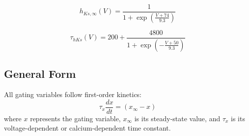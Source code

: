 \documentclass{article}
\begin{document}
\begin{equation}
h_{Ks,\infty}(V) = \frac{1}{1 + \exp\left(\frac{V + 74}{9.3}\right)}
\end{equation}

\begin{equation}
\tau_{hKs}(V) = 200 + \frac{4800}{1 + \exp\left(-\frac{V + 50}{9.3}\right)}
\end{equation}

\subsection*{General Form}
All gating variables follow first-order kinetics:
\begin{equation}
\tau_x \frac{dx}{dt} = (x_{\infty} - x)
\end{equation}
where $x$ represents the gating variable, $x_{\infty}$ is its steady-state value, and $\tau_x$ is its voltage-dependent or calcium-dependent time constant.
\end{document}

